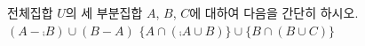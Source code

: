 전체집합 $U$의 세 부분집합 $A$, $B$, $C$에 대하여 다음을 간단히 하시오.
 $(A-\comp{B})\cup(B-A)$
 $\{A\cap(\comp{A}\cup B)\}\cup\{B\cap(B\cup C)\}$
